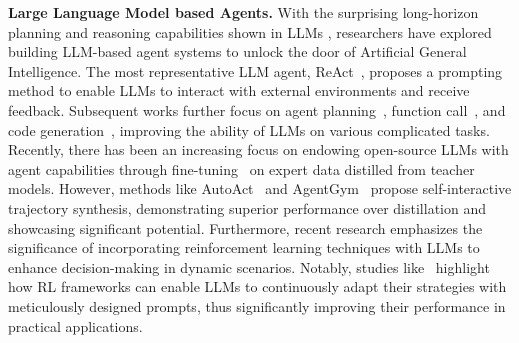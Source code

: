 \noindent\textbf{Large Language Model based Agents.}
With the surprising long-horizon planning and reasoning capabilities shown in LLMs \cite{plan}, researchers have explored building LLM-based agent systems \cite{Aglite} to unlock the door of Artificial General Intelligence. The most representative LLM agent, ReAct~\cite{react}, proposes a prompting method to enable LLMs to interact with external environments and receive feedback. Subsequent works further focus on agent planning~\cite{reflection}, function call~\cite{toolformer}, and code generation~\cite{pot}, improving the ability of LLMs on various complicated tasks. Recently, there has been an increasing focus on endowing open-source LLMs with agent capabilities through fine-tuning~\cite{ditill} on expert data distilled from teacher models. However, methods like AutoAct~\cite{autoact} and AgentGym~\cite{agentgym} propose self-interactive trajectory synthesis, demonstrating superior performance over distillation and showcasing significant potential. Furthermore, recent research emphasizes the significance of incorporating reinforcement learning techniques with LLMs to enhance decision-making in dynamic scenarios. Notably, studies like~\cite{rl} highlight how RL frameworks can enable LLMs to continuously adapt their strategies with meticulously designed prompts, thus significantly improving their performance in practical applications. 


